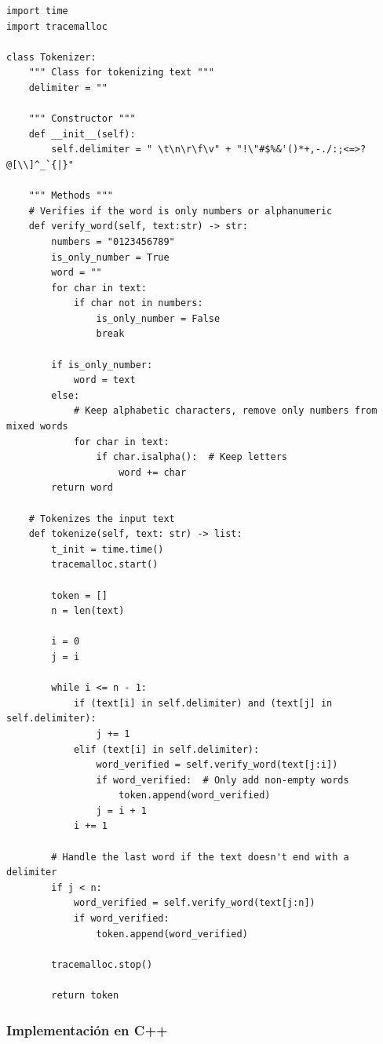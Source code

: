 \documentclass[12pt,a4paper]{article}
\begin{document}
\begin{lstlisting}[caption=Clase Tokenizer en Python]
import time
import tracemalloc

class Tokenizer:
    """ Class for tokenizing text """
    delimiter = ""
    
    """ Constructor """
    def __init__(self):
        self.delimiter = " \t\n\r\f\v" + "!\"#$%&'()*+,-./:;<=>?@[\\]^_`{|}"

    """ Methods """
    # Verifies if the word is only numbers or alphanumeric
    def verify_word(self, text:str) -> str:
        numbers = "0123456789"
        is_only_number = True
        word = ""
        for char in text:
            if char not in numbers:
                is_only_number = False
                break 

        if is_only_number:
            word = text
        else:
            # Keep alphabetic characters, remove only numbers from mixed words
            for char in text:
                if char.isalpha():  # Keep letters
                    word += char
        return word
    
    # Tokenizes the input text
    def tokenize(self, text: str) -> list:              
        t_init = time.time()
        tracemalloc.start()
        
        token = []
        n = len(text)
        
        i = 0
        j = i
        
        while i <= n - 1:
            if (text[i] in self.delimiter) and (text[j] in self.delimiter):
                j += 1
            elif (text[i] in self.delimiter):
                word_verified = self.verify_word(text[j:i])
                if word_verified:  # Only add non-empty words
                    token.append(word_verified)
                j = i + 1
            i += 1

        # Handle the last word if the text doesn't end with a delimiter
        if j < n:
            word_verified = self.verify_word(text[j:n])
            if word_verified:
                token.append(word_verified)

        tracemalloc.stop()
        
        return token
\end{lstlisting}

\subsubsection{Implementación en C++}
\end{document}

